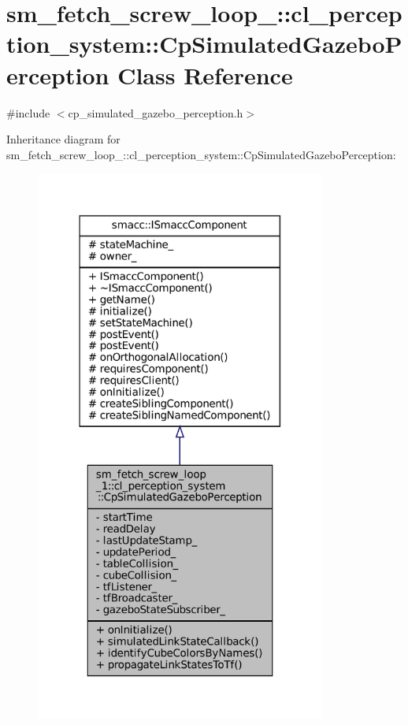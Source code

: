 \hypertarget{classsm__fetch__screw__loop__1_1_1cl__perception__system_1_1CpSimulatedGazeboPerception}{}\section{sm\+\_\+fetch\+\_\+screw\+\_\+loop\+\_\+:\+:cl\+\_\+perception\+\_\+system\+:\+:Cp\+Simulated\+Gazebo\+Perception Class Reference}
\label{classsm__fetch__screw__loop__1_1_1cl__perception__system_1_1CpSimulatedGazeboPerception}


{\ttfamily \#include $<$cp\+\_\+simulated\+\_\+gazebo\+\_\+perception.\+h$>$}



Inheritance diagram for sm\+\_\+fetch\+\_\+screw\+\_\+loop\+\_\+:\+:cl\+\_\+perception\+\_\+system\+:\+:Cp\+Simulated\+Gazebo\+Perception\+:
\nopagebreak
\begin{figure}[H]
\begin{center}
\leavevmode
\includegraphics[width=271pt]{classsm__fetch__screw__loop__1_1_1cl__perception__system_1_1CpSimulatedGazeboPerception__inherit__graph}
\end{center}
\end{figure}


